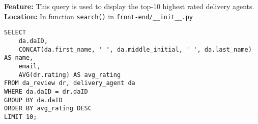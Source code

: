 \textbf{Feature:} This query is used to display the top-10 highest rated delivery agents. \\
\textbf{Location:} In function \texttt{search()} in \texttt{front-end/\_\_init\_\_.py}

\begin{lstlisting}
SELECT
    da.daID,
    CONCAT(da.first_name, ' ', da.middle_initial, ' ', da.last_name) AS name,
    email,
    AVG(dr.rating) AS avg_rating
FROM da_review dr, delivery_agent da
WHERE da.daID = dr.daID
GROUP BY da.daID
ORDER BY avg_rating DESC
LIMIT 10;
\end{lstlisting}